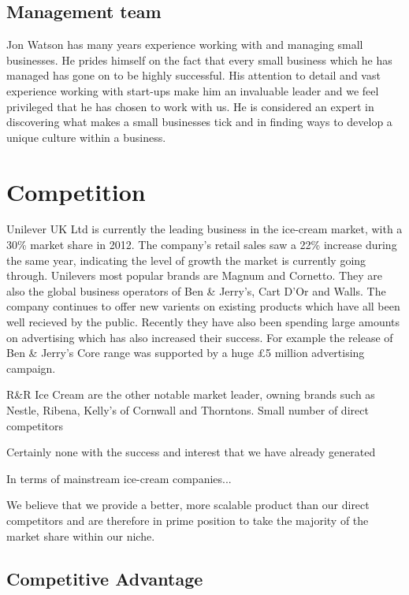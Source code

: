 \documentclass{article}
\begin{document}
  \subsection{Management team}

Jon Watson has many years experience working with and managing small
businesses. He prides himself on the fact that every small business which he has managed has gone on to be highly successful. His attention to detail and vast experience working with start-ups make him an invaluable leader and we feel privileged that he has chosen to work with us. He is considered an expert in discovering what makes a small businesses tick and in finding ways to develop a unique culture within a business.


\section{Competition}

  Unilever UK Ltd is currently the leading business in the ice-cream market, with a 30\% market share in 2012. The company's retail sales saw a 22\% increase during the same year, indicating the level of growth the market is currently going through. Unilevers most popular brands are Magnum and Cornetto. They are also the global business operators of Ben \& Jerry's, Cart D'Or and Walls. The company continues to offer new varients on existing products which have all been well recieved by the public. Recently they have also been spending large amounts on advertising which has also increased their success. For example the release of Ben \& Jerry's Core range was supported by a huge £5 million advertising campaign.

  R\&R Ice Cream are the other notable market leader, owning brands such as Nestle, Ribena, Kelly's of Cornwall and Thorntons.  
  Small number of direct competitors

  Certainly none with the success and interest that we have already generated

  In terms of mainstream ice-cream companies...

    We believe that we provide a better, more scalable product than our direct competitors and are therefore in prime position to take the majority of the market share within our niche.


  \subsection{Competitive Advantage}
\end{document}
